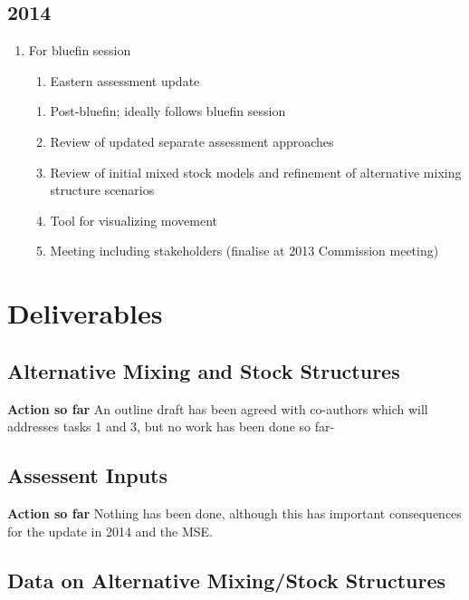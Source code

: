 \subsection{2014}


\begin{enumerate}
\item For bluefin session
\begin{enumerate}
\item Eastern assessment update 
\end{enumerate}

\begin{enumerate}
\item Post-bluefin; ideally follows bluefin session
\item Review of updated separate assessment approaches
\item Review of initial mixed stock models and refinement of alternative mixing structure scenarios
\item Tool for visualizing movement
\item Meeting including stakeholders (finalise at 2013 Commission meeting)
\end{enumerate}
\end{enumerate}

\newpage
\section{Deliverables}

\subsection{Alternative Mixing and Stock Structures} 

\textbf{Action so far}
An outline draft has been agreed with co-authors which will addresses tasks 1 and 3,
but no work has been done so far-

\subsection{Assessent Inputs} 


\textbf{Action so far}
Nothing has been done, although this has important consequences for the update in 2014 and the MSE.

\subsection{Data on Alternative Mixing/Stock Structures} 

